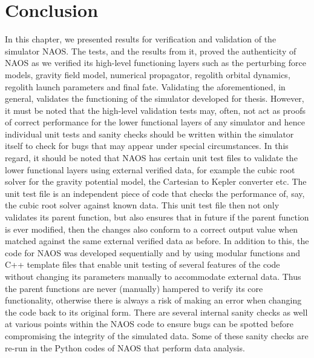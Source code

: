 \FloatBarrier

\section{Conclusion}
\label{sec:conclusion_vv}
In this chapter, we presented results for verification and validation of the simulator \gls{NAOS}. The tests, and the results from it, proved the authenticity of \gls{NAOS} as we verified its high-level functioning layers such as the perturbing force models, gravity field model, numerical propagator, regolith orbital dynamics, regolith launch parameters and final fate. Validating the aforementioned, in general, validates the functioning of the simulator developed for thesis. However, it must be noted that the high-level validation tests may, often, not act as proofs of correct performance for the lower functional layers of any simulator and hence individual unit tests and sanity checks should be written within the simulator itself to check for bugs that may appear under special circumstances.
%
\newline\newline
%
In this regard, it should be noted that \gls{NAOS} has certain unit test files to validate the lower functional layers using external verified data, for example the cubic root solver for the gravity potential model, the Cartesian to Kepler converter etc. The unit test file is an independent piece of code that checks the performance of, say, the cubic root solver against known data. This unit test file then not only validates its parent function, but also ensures that in future if the parent function is ever modified, then the changes also conform to a correct output value when matched against the same external verified data as before.
%
\newline\newline
%
In addition to this, the code for \gls{NAOS} was developed sequentially and by using modular functions and C++ template files that enable unit testing of several features of the code without changing its parameters manually to accommodate external data. Thus the parent functions are never (manually) hampered to verify its core functionality, otherwise there is always a risk of making an error when changing the code back to its original form. There are several internal sanity checks as well at various points within the \gls{NAOS} code to ensure bugs can be spotted before compromising the integrity of the simulated data. Some of these sanity checks are re-run in the Python codes of \gls{NAOS} that perform data analysis.
